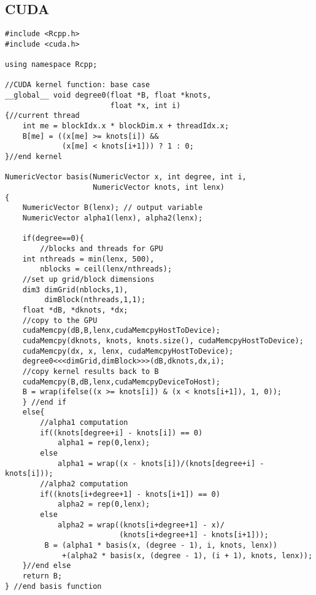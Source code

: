 \subsection{CUDA}
\lstset{language=C++}
\begin{lstlisting}
#include <Rcpp.h>
#include <cuda.h>

using namespace Rcpp;

//CUDA kernel function: base case
__global__ void degree0(float *B, float *knots,
                        float *x, int i)
{//current thread
    int me = blockIdx.x * blockDim.x + threadIdx.x;
    B[me] = ((x[me] >= knots[i]) &&
             (x[me] < knots[i+1])) ? 1 : 0;
}//end kernel

NumericVector basis(NumericVector x, int degree, int i,
                    NumericVector knots, int lenx)
{
    NumericVector B(lenx); // output variable
    NumericVector alpha1(lenx), alpha2(lenx);

    if(degree==0){
        //blocks and threads for GPU
    int nthreads = min(lenx, 500),
        nblocks = ceil(lenx/nthreads);
    //set up grid/block dimensions
    dim3 dimGrid(nblocks,1),
         dimBlock(nthreads,1,1);
    float *dB, *dknots, *dx;
    //copy to the GPU
    cudaMemcpy(dB,B,lenx,cudaMemcpyHostToDevice);
    cudaMemcpy(dknots, knots, knots.size(), cudaMemcpyHostToDevice);
    cudaMemcpy(dx, x, lenx, cudaMemcpyHostToDevice);
    degree0<<<dimGrid,dimBlock>>>(dB,dknots,dx,i);
    //copy kernel results back to B
    cudaMemcpy(B,dB,lenx,cudaMemcpyDeviceToHost);
    B = wrap(ifelse((x >= knots[i]) & (x < knots[i+1]), 1, 0));
    } //end if
    else{
        //alpha1 computation
        if((knots[degree+i] - knots[i]) == 0)
            alpha1 = rep(0,lenx);
        else
            alpha1 = wrap((x - knots[i])/(knots[degree+i] - knots[i]));
        //alpha2 computation
        if((knots[i+degree+1] - knots[i+1]) == 0)
            alpha2 = rep(0,lenx);
        else
            alpha2 = wrap((knots[i+degree+1] - x)/
                          (knots[i+degree+1] - knots[i+1]));
         B = (alpha1 * basis(x, (degree - 1), i, knots, lenx))
             +(alpha2 * basis(x, (degree - 1), (i + 1), knots, lenx));
    }//end else
    return B;
} //end basis function


\end{lstlisting}
